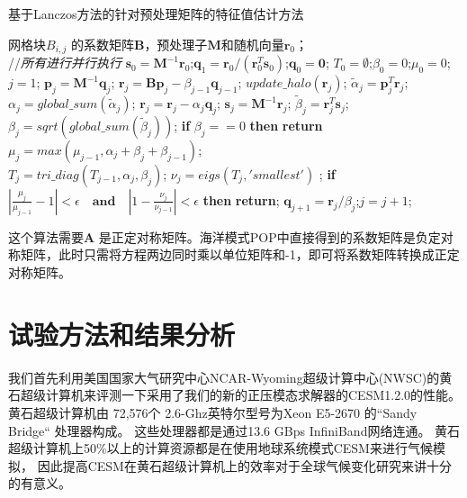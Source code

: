 \begin{algorithm}[!ht]
\caption{基于Lanczos方法的针对预处理矩阵的特征值估计方法}
\label{alg:lanczos_pre}
\begin{algorithmic}[1]
\REQUIRE 网格块$B_{i,j}$ 的系数矩阵$\textbf{B}$，预处理子$\textbf{M}$和随机向量$\textbf{r}_0$； \\
 //\qquad    \textit{所有进行并行执行}
\STATE $\textbf{s}_0=\textbf{M}^{-1}\textbf{r}_0$;\quad $\textbf{q}_1 = \textbf{r}_0/({\textbf{r}_0^T\textbf{s}_0})$;\quad $\textbf{q}_0=\textbf{0}$;
\STATE $T_0=\emptyset$;\quad $\beta_0 =0$;\quad  $\mu_0 =0$;\quad $j=1$;
\STATE $\textbf{p}_j = \textbf{M}^{-1}\textbf{q}_j$; \quad $\textbf{r}_j=\textbf{B}\textbf{p}_j-\beta_{j-1}\textbf{q}_{j-1}$;
\STATE $update\_halo(\textbf{r}_j)$;
\STATE $\tilde{\alpha}_j =\textbf{p}_j^T\textbf{r}_j$; \quad $\alpha_j=global\_sum(\tilde{\alpha}_j)$;
\STATE $\textbf{r}_j=\textbf{r}_j-\alpha_{j}\textbf{q}_{j}$; \quad $\textbf{s}_j = \textbf{M}^{-1}\textbf{r}_j$;
\STATE $\tilde{\beta}_j = \textbf{r}_j^T\textbf{s}_j$; \quad $\beta_j=sqrt(global\_sum(\tilde{\beta}_j))$;
\STATE \textbf{if} $\beta_j == 0$ \textbf{then} \textbf{return}
\STATE $\mu_j = max(\mu_{j-1},\alpha_j+\beta_j+\beta_{j-1})$; \label{lan_gersh}\\
\STATE $T_j=tri\_diag(T_{j-1},\alpha_j,\beta_j)$; \label{lan_tm}
\STATE $\nu_j = eigs(T_j,'smallest')$ ; \label{lan_nu}
\STATE \textbf{if} $|\frac{\mu_j}{\mu_{j-1}} -1 |< \epsilon\quad\textbf{and}\quad|1- \frac{\nu_j}{\nu_{j-1}}|< \epsilon$ \textbf{then} \textbf{return}; \label{lanczos_converge}
\STATE $\textbf{q}_{j+1}= \textbf{r}_j/\beta_j$;\quad $j=j+1$;
\ENDWHILE
\end{algorithmic}
\end{algorithm}

这个算法需要$\textbf{A}$ 是正定对称矩阵。海洋模式POP中直接得到的系数矩阵是负定对称矩阵，此时只需将方程两边同时乘以单位矩阵和-1，即可将系数矩阵转换成正定对称矩阵。 

\section{试验方法和结果分析}
\label{precond:exp}

我们首先利用美国国家大气研究中心NCAR-Wyoming超级计算中心(NWSC)\cite{loft:2015}的黄石超级计算机来评测一下采用了我们的新的正压模态求解器的CESM1.2.0的性能。 
黄石超级计算机由 72,576个
2.6-Ghz英特尔型号为Xeon E5-2670 的“Sandy Bridge“ 处理器构成。 
这些处理器都是通过13.6 GBps InfiniBand网络连通。   
黄石超级计算机上50\%以上的计算资源都是在使用地球系统模式CESM来进行气候模拟， 
因此提高CESM在黄石超级计算机上的效率对于全球气候变化研究来讲十分的有意义\cite{wf2014}。 


